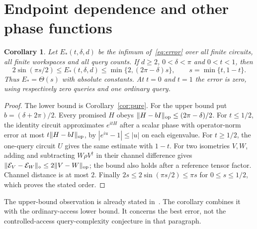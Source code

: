 \documentclass[11pt]{article}
\newtheorem{corollary}[theorem]{Corollary}
\newcommand{\E}{\mathcal E}
\begin{document}
\section{Endpoint dependence and other phase functions}
\begin{corollary}\label{cor:endpoint}
Let $E_*(t,\delta,d)$ be the infimum of~\eqref{eq:error} over all finite
circuits, all finite workspaces and all query counts. If
$d\geq2$, $0<\delta<\pi$ and $0<t<1$, then
\[
 2\sin(\pi s/2)\leq E_*(t,\delta,d)
 \leq\min\{2,(2\pi-\delta)s\},\qquad s=\min\{t,1-t\}.
\]
Thus $E_*=\Theta(s)$ with absolute constants. At $t=0$ and $t=1$ the
error is zero, using respectively zero queries and one ordinary query.
\end{corollary}
\begin{proof}
The lower bound is Corollary~\ref{cor:pure}. For the upper bound put
$b=(\delta+2\pi)/2$. Every promised $H$ obeys
$\|H-bI\|_{\rm op}\leq(2\pi-\delta)/2$.
For $t\leq1/2$, the identity circuit approximates $e^{itH}$ after a
scalar phase with operator-norm error at most
$t\|H-bI\|_{\rm op}$, by $|e^{iu}-1|\leq|u|$ on each eigenvalue.
For $t\geq1/2$, the one-query circuit $U$ gives the same estimate with
$1-t$. For two isometries $V,W$, adding and subtracting $W\rho V^\dagger$
in their channel difference gives
$\|\E_V-\E_W\|_\diamond\leq2\|V-W\|_{\rm op}$;
the bound also holds after a reference tensor factor. Channel distance
is at most $2$. Finally $2s\leq2\sin(\pi s/2)\leq\pi s$ for
$0\leq s\leq1/2$, which proves the stated order.
\end{proof}
The upper-bound observation is already stated in~\cite[Section V,
``Dependence on $t$'']{liu}. The corollary combines it with the ordinary-access
lower bound. It concerns the best error, not the controlled-access
query-complexity conjecture in that paragraph.
\end{document}
